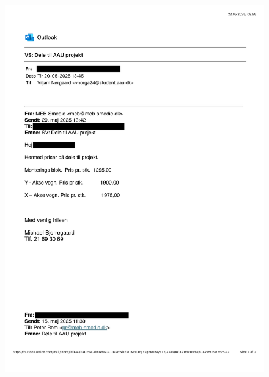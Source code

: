 \begin{figure} [H]
    \centering
    \includegraphics[width=0.9\linewidth]{bilag/Media/Media/Mail_1.png}
\end{figure}

